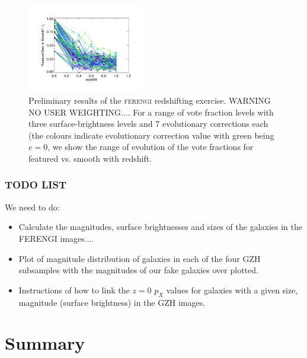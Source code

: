 \documentclass[usenatbib]{mn2e}
\newcommand{\ferengi}{\textsc{ferengi}}
\begin{document}
\begin{figure}
\begin{center}

\includegraphics[width=0.45\textwidth]{figures/somewhat_fake_results.pdf}

\caption{Preliminary results of the \ferengi{} redshifting exercise. WARNING NO USER WEIGHTING.... For a range of vote fraction levels with three surface-brightness levels and 7 evolutionary corrections each (the colours indicate evolutionary correction value with green being $e=0$, we show the range of evolution of the vote fractions for featured vs. smooth with redshift.}

\label{fig:ferengi_results_fake}

\end{center}
\end{figure}


\subsubsection{TODO LIST}
We need to do: 
\begin{itemize}
\item Calculate the magnitudes, surface brightnesses and sizes of the galaxies in the FERENGI images....
\item Plot of magnitude distribution of galaxies in each of the four GZH subsamples with the magnitudes of our fake galaxies over plotted. 
\item Instructions of how to link the $z=0$ $p_X$ values for galaxies with a given size, magnitude (surface brightness) in the GZH images. 
\end{itemize}



\section{Summary}
\end{document}
